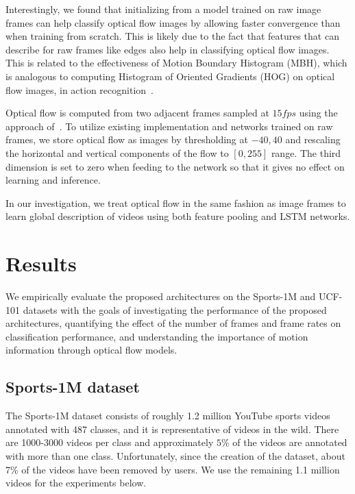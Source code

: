 \documentclass[10pt,twocolumn,letterpaper]{article}
\begin{document}
 Interestingly, we found that initializing from a model trained on raw image
 frames can help classify optical flow images by allowing faster convergence
 than when training from scratch. This is likely due to the fact that features that can describe for raw
 frames like edges also help in classifying optical flow images. This is
 related to the effectiveness of Motion Boundary Histogram (MBH), which is analogous to computing Histogram of Oriented Gradients (HOG) on
 optical flow images, in action recognition~\cite{wang13}.

Optical flow is computed from two adjacent frames sampled at $15 fps$ using the approach of~\cite{zach07}.
To utilize existing implementation and networks trained on raw frames, we store optical flow as images
by thresholding at $-40, 40$ and rescaling the horizontal and vertical components of the flow to $[0,255]$ range.
The third dimension is set to zero when feeding to the network so that it gives no effect on learning and inference.

 In our investigation, we treat optical flow in the same fashion as image frames to learn global description of videos using both feature pooling and LSTM
networks.


\vspace{-1em}\section{Results}\vspace{-1em}\label{sec:results}
We empirically evaluate the proposed architectures on the Sports-1M and UCF-101 datasets with the goals of
investigating the performance of the proposed architectures, quantifying the effect of the number of frames and frame rates on classification
performance, and understanding the importance of motion information through optical flow models.

\vspace{-.6em}\subsection{Sports-1M dataset}\vspace{-.6em}\label{subsec:sports-1m}
The Sports-1M dataset \cite{karpathy2014large} consists of roughly 1.2 million
YouTube sports videos annotated with 487 classes, and it is representative of
videos in the wild. There are 1000-3000 videos per class and approximately
$5\%$ of the videos are annotated with more than one class. Unfortunately,
since the creation of the dataset, about 7\% of the videos have been removed by
users. We use the remaining 1.1 million videos for the experiments below.
\end{document}
